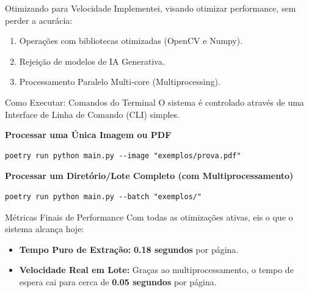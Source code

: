 \documentclass[aspectratio=169]{beamer}
\begin{document}
\begin{frame}{Otimizando para Velocidade}    
    \vspace{0.3cm}
    Implementei, visando otimizar performance, sem perder a acurácia:
    \begin{enumerate}
        \item Operações com bibliotecas otimizadas (OpenCV e Numpy).
        \item Rejeição de modelos de IA Generativa.
        \item Processamento Paralelo Multi-core (Multiprocessing).
    \end{enumerate}
\end{frame}

\begin{frame}[fragile]{Como Executar: Comandos do Terminal}
    O sistema é controlado através de uma Interface de Linha de Comando (CLI) simples.
    
    \vspace{0.3cm}
    \textbf{Processar uma Única Imagem ou PDF}
    \begin{verbatim}
poetry run python main.py --image "exemplos/prova.pdf"
    \end{verbatim}
    
    \vspace{0.2cm}
    \textbf{Processar um Diretório/Lote Completo (com Multiprocessamento)}
    \begin{verbatim}
poetry run python main.py --batch "exemplos/"
    \end{verbatim}
\end{frame}

\begin{frame}{Métricas Finais de Performance}
    Com todas as otimizações ativas, eis o que o sistema alcança hoje:
    
    \vspace{0.5cm}
    \begin{itemize}
        \item \textbf{Tempo Puro de Extração:} \textbf{0.18 segundos} por página.
        \item \textbf{Velocidade Real em Lote:} Graças ao multiprocessamento, o tempo de espera cai para cerca de \textbf{0.05 segundos} por página.
    \end{itemize}
\end{frame}
\end{document}
